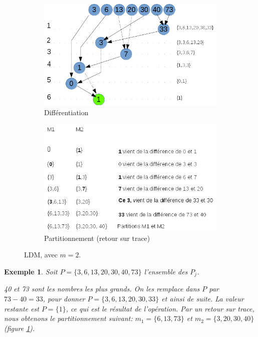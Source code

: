 \documentclass[a4paper,12pt]{report}
\theoremstyle{plain}				%
\newtheorem{example}{Exemple}
\theoremstyle{definition}				%
\begin{document}
\begin{itemize}
\begin{figure}
{\centering}
	\begin{subfigure}[b]{0.45\linewidth}
    \includegraphics[width=\linewidth]
    {Biblio_PCmax_Rendu_exLDM_1_2m.jpg}
    \caption{Différentiation}
  	\end{subfigure}
\hfill%
	\begin{subfigure}[b]{0.45\linewidth}
    \includegraphics[width=\linewidth]
    {Biblio_PCmax_Rendu_exLDM_2_2m.jpg}
    \caption{Partitionnement (retour sur trace)}
  	\end{subfigure}
  	\caption{LDM, avec $m=2$.}
  	\label{fig:LDM2M}
\end{figure}

\begin{example}
Soit $P=\{3,6,13,20,30,40,73\}$ l'ensemble des $P_j$.

40 et 73 sont les nombres les plus grands.
On les remplace dans $P$ par $73 - 40 = 33$, pour donner
$P=\{3,6,13,20,30,33\}$ et ainsi de suite.
La valeur restante est $P= \{1\}$, ce qui est le résultat de
l'opération.
Par un retour sur trace, nous obtenons le partitionnement suivant:
$m_1 = \{ 6,13,73 \}$ et $m_2 = \{ 3,20,30,40 \}$ (figure
\ref{fig:LDM2M}).


\end{example}
\end{itemize}
\end{document}
